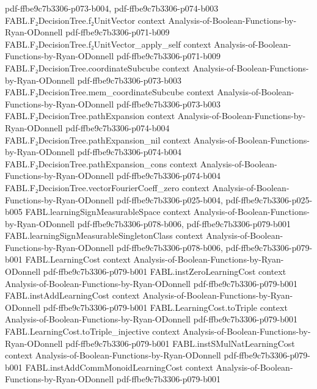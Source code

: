 \begin{theorem}
  {pdf-ffbe9c7b3306-p073-b004,
    pdf-ffbe9c7b3306-p074-b003}
\proofstep
  {FABL.F₂DecisionTree.f₂UnitVector}
  {context}
  {Analysis-of-Boolean-Functions-by-Ryan-ODonnell}
  {pdf-ffbe9c7b3306-p071-b009}
\proofstep
  {FABL.F₂DecisionTree.f₂UnitVector_apply_self}
  {context}
  {Analysis-of-Boolean-Functions-by-Ryan-ODonnell}
  {pdf-ffbe9c7b3306-p071-b009}
\proofstep
  {FABL.F₂DecisionTree.coordinateSubcube}
  {context}
  {Analysis-of-Boolean-Functions-by-Ryan-ODonnell}
  {pdf-ffbe9c7b3306-p073-b003}
\proofstep
  {FABL.F₂DecisionTree.mem_coordinateSubcube}
  {context}
  {Analysis-of-Boolean-Functions-by-Ryan-ODonnell}
  {pdf-ffbe9c7b3306-p073-b003}
\proofstep
  {FABL.F₂DecisionTree.pathExpansion}
  {context}
  {Analysis-of-Boolean-Functions-by-Ryan-ODonnell}
  {pdf-ffbe9c7b3306-p074-b004}
\proofstep
  {FABL.F₂DecisionTree.pathExpansion_nil}
  {context}
  {Analysis-of-Boolean-Functions-by-Ryan-ODonnell}
  {pdf-ffbe9c7b3306-p074-b004}
\proofstep
  {FABL.F₂DecisionTree.pathExpansion_cons}
  {context}
  {Analysis-of-Boolean-Functions-by-Ryan-ODonnell}
  {pdf-ffbe9c7b3306-p074-b004}
\proofstep
  {FABL.F₂DecisionTree.vectorFourierCoeff_zero}
  {context}
  {Analysis-of-Boolean-Functions-by-Ryan-ODonnell}
  {pdf-ffbe9c7b3306-p025-b004,
    pdf-ffbe9c7b3306-p025-b005}
\proofstep
  {FABL.learningSignMeasurableSpace}
  {context}
  {Analysis-of-Boolean-Functions-by-Ryan-ODonnell}
  {pdf-ffbe9c7b3306-p078-b006,
    pdf-ffbe9c7b3306-p079-b001}
\proofstep
  {FABL.learningSignMeasurableSingletonClass}
  {context}
  {Analysis-of-Boolean-Functions-by-Ryan-ODonnell}
  {pdf-ffbe9c7b3306-p078-b006,
    pdf-ffbe9c7b3306-p079-b001}
\proofstep
  {FABL.LearningCost}
  {context}
  {Analysis-of-Boolean-Functions-by-Ryan-ODonnell}
  {pdf-ffbe9c7b3306-p079-b001}
\proofstep
  {FABL.instZeroLearningCost}
  {context}
  {Analysis-of-Boolean-Functions-by-Ryan-ODonnell}
  {pdf-ffbe9c7b3306-p079-b001}
\proofstep
  {FABL.instAddLearningCost}
  {context}
  {Analysis-of-Boolean-Functions-by-Ryan-ODonnell}
  {pdf-ffbe9c7b3306-p079-b001}
\proofstep
  {FABL.LearningCost.toTriple}
  {context}
  {Analysis-of-Boolean-Functions-by-Ryan-ODonnell}
  {pdf-ffbe9c7b3306-p079-b001}
\proofstep
  {FABL.LearningCost.toTriple_injective}
  {context}
  {Analysis-of-Boolean-Functions-by-Ryan-ODonnell}
  {pdf-ffbe9c7b3306-p079-b001}
\proofstep
  {FABL.instSMulNatLearningCost}
  {context}
  {Analysis-of-Boolean-Functions-by-Ryan-ODonnell}
  {pdf-ffbe9c7b3306-p079-b001}
\proofstep
  {FABL.instAddCommMonoidLearningCost}
  {context}
  {Analysis-of-Boolean-Functions-by-Ryan-ODonnell}
  {pdf-ffbe9c7b3306-p079-b001}
\proofstep

\end{theorem}
